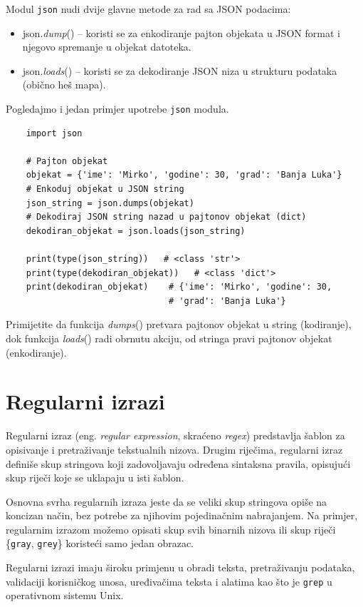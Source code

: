 Modul \texttt{json} nudi dvije glavne metode za rad sa JSON podacima:


\begin{itemize}
	\item json.\textit{dump}() -- koristi se za enkodiranje pajton objekata u JSON format i njegovo spremanje u objekat  datoteka.
	\item json.\textit{loads}() -- koristi se za dekodiranje JSON niza u strukturu podataka (obično heš mapa).
\end{itemize}

Pogledajmo i jedan primjer upotrebe \texttt{json} modula. 

\begin{verbatim}
	import json
	
	# Pajton objekat
	objekat = {'ime': 'Mirko', 'godine': 30, 'grad': 'Banja Luka'}
	# Enkoduj objekat u JSON string
	json_string = json.dumps(objekat)
	# Dekodiraj JSON string nazad u pajtonov objekat (dict)
	dekodiran_objekat = json.loads(json_string)
	
	print(type(json_string))   # <class 'str'>
	print(type(dekodiran_objekat))   # <class 'dict'>
	print(dekodiran_objekat)    # {'ime': 'Mirko', 'godine': 30,
		                        # 'grad': 'Banja Luka'}
\end{verbatim}


Primijetite da funkcija \textit{dumps}() pretvara pajtonov objekat u string (kodiranje), dok funkcija \textit{loads}() radi obrnutu akciju, od stringa pravi pajtonov objekat (enkodiranje). 

\section{Regularni izrazi}

Regularni izraz (eng. \textit{regular expression}, skraćeno \textit{regex}) predstavlja šablon za opisivanje i pretraživanje tekstualnih nizova. Drugim riječima, regularni izraz definiše skup stringova koji zadovoljavaju određena sintaksna pravila, opisujući skup riječi koje se uklapaju u isti šablon. 

Osnovna svrha regularnih izraza jeste da se veliki skup stringova opiše na koncizan način, bez potrebe za njihovim pojedinačnim nabrajanjem. Na primjer, regularnim izrazom možemo opisati skup svih binarnih nizova ili skup riječi \{\texttt{gray}, \texttt{grey}\} koristeći samo jedan obrazac.

Regularni izrazi imaju široku primjenu u obradi teksta, pretraživanju podataka, validaciji korisničkog unosa, uređivačima teksta i alatima kao što je \texttt{grep} u operativnom sistemu Unix.

